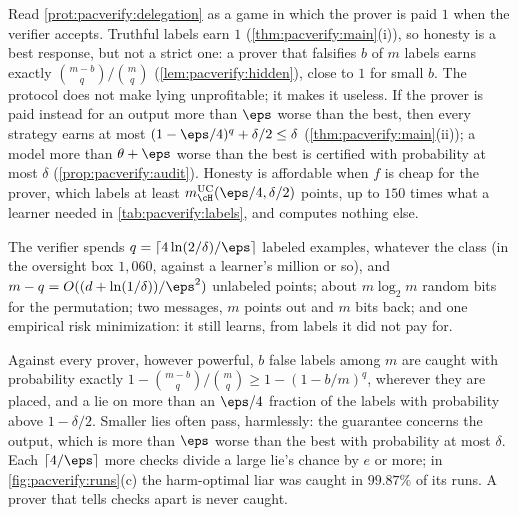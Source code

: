 \begin{refsection}
\questionone Read \cref{prot:pacverify:delegation} as a game in which the prover is paid $1$ when the verifier accepts. Truthful labels earn $1$ (\cref{thm:pacverify:main}(i)), so honesty is a best response, but not a strict one: a prover that falsifies $b$ of $m$ labels earns exactly $\binom{m-b}{q}/\binom mq$ (\cref{lem:pacverify:hidden}), close to $1$ for small $b$. The protocol does not make lying unprofitable; it makes it useless. If the prover is paid instead for an output more than $\eps$ worse than the best, then every strategy earns at most $(1-\eps/4)^q+\delta/2\le\delta$ (\cref{thm:pacverify:main}(ii)); a model more than $\theta+\eps$ worse than the best is certified with probability at most $\delta$ (\cref{prop:pacverify:audit}). Honesty is affordable when $f$ is cheap for the prover, which labels at least $\pacverifyuc(\eps/4,\delta/2)$ points, up to $150$ times what a learner needed in \cref{tab:pacverify:labels}, and computes nothing else.

\questiontwo The verifier spends $q=\lceil4\ln(2/\delta)/\eps\rceil$ labeled examples, whatever the class (in the oversight box $1{,}060$, against a learner's million or so), and $m-q=O((d+\ln(1/\delta))/\eps^2)$ unlabeled points; about $m\log_2m$ random bits for the permutation; two messages, $m$ points out and $m$ bits back; and one empirical risk minimization: it still learns, from labels it did not pay for.

\questionthree Against every prover, however powerful, $b$ false labels among $m$ are caught with probability exactly $1-\binom{m-b}{q}/\binom mq\ge1-(1-b/m)^q$, wherever they are placed, and a lie on more than an $\eps/4$ fraction of the labels with probability above $1-\delta/2$. Smaller lies often pass, harmlessly: the guarantee concerns the output, which is more than $\eps$ worse than the best with probability at most $\delta$. Each $\lceil4/\eps\rceil$ more checks divide a large lie's chance by $e$ or more; in \cref{fig:pacverify:runs}(c) the harm-optimal liar was caught in $99.87\%$ of its runs. A prover that tells checks apart is never caught.



\end{refsection}
